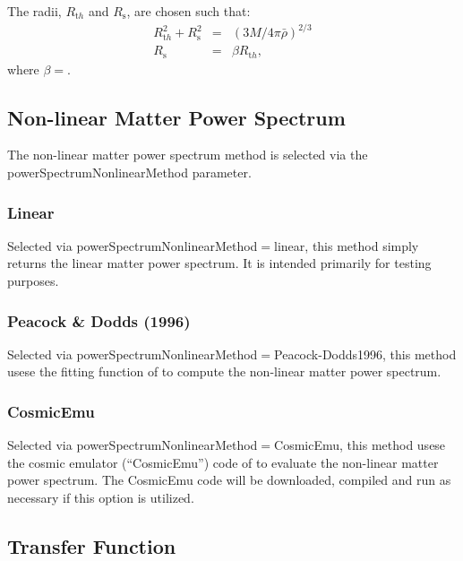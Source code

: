The radii, $R_{\mathrm th}$ and $R_{\mathrm s}$, are chosen such that:
\begin{eqnarray}
R_{\mathrm th}^2 + R_{\mathrm s}^2 &=& (3M/4\pi\bar{\rho})^{2/3} \\
R_{\mathrm s} &=& \beta R_{\mathrm th},
\end{eqnarray}
where $\beta=${\normalfont \ttfamily [powerSpectrumWindowFunctionSharpKSpaceTopHatRadiiRatio]}.

\subsection{Non-linear Matter Power Spectrum}

The non-linear matter power spectrum method is selected via the {\normalfont \ttfamily powerSpectrumNonlinearMethod} parameter.

\subsubsection{Linear}

Selected via {\normalfont \ttfamily powerSpectrumNonlinearMethod}$=${\normalfont \ttfamily linear}, this method simply returns the linear matter power spectrum. It is intended primarily for testing purposes.

\subsubsection{Peacock \& Dodds (1996)}

Selected via {\normalfont \ttfamily powerSpectrumNonlinearMethod}$=${\normalfont \ttfamily Peacock-Dodds1996}, this method usese the fitting function of \cite{peacock_non-linear_1996} to compute the non-linear matter power spectrum.

\subsubsection{CosmicEmu}

Selected via {\normalfont \ttfamily powerSpectrumNonlinearMethod}$=${\normalfont \ttfamily CosmicEmu}, this method usese the cosmic emulator (``CosmicEmu'') code of \cite{lawrence_coyote_2010} to evaluate the non-linear matter power spectrum. The CosmicEmu code will be downloaded, compiled and run as necessary if this option is utilized.

\subsection{Transfer Function}\label{sec:TransferFunction}

